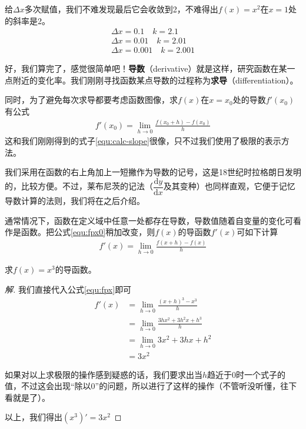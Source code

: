 给$\Delta x$多次赋值，我们不难发现最后它会收敛到2，不难得出$f(x)=x^2$在$x=1$处的斜率是2。
\begin{gather*}
    \Delta x=0.1 \quad k=2.1 \\
    \Delta x=0.01 \quad k=2.01 \\
    \Delta x=0.001 \quad k=2.001
\end{gather*}

好，我们算完了，感觉很简单吧！\textbf{导数}（derivative）就是这样，研究函数在某一点附近的变化率。我们刚刚寻找函数某点导数的过程称为\textbf{求导}（differentiation）。

同时，为了避免每次求导都要考虑函数图像，求$f(x)$在$x=x_0$处的导数$f'(x_0)$有公式
\begin{gather}
    f'(x_0)=\lim_{h\to0}\frac{f(x_0+h)-f(x_0)}{h} \label{equ:fpx0}
\end{gather}
这和我们刚刚得到的式子\eqref{equ:calc-slope}很像，只不过我们使用了极限的表示方法。

我们采用在函数的右上角加上一短撇作为导数的记号，这是18世纪时拉格朗日发明的，比较方便。不过，莱布尼茨的记法（$\dfrac{\mathrm{d}y}{\mathrm{d}x}$及其变种）也同样直观，它便于记忆导数计算的法则，我们将在之后介绍。

通常情况下，函数在定义域中任意一处都存在导数，导数值随着自变量的变化可看作是函数。把公式\eqref{equ:fpx0}稍加改变，则$f(x)$的导函数$f'(x)$可如下计算
\begin{gather}
    f'(x)=\lim_{h\to0}\frac{f(x+h)-f(x)}{h} \label{equ:fpx}
\end{gather}

\begin{example}
    求$f(x)=x^3$的导函数。
\end{example}

\begin{proof}[解]
    我们直接代入公式\eqref{equ:fpx}即可
    \begin{align*}
        f'(x)&=\lim_{h\to0}\frac{(x+h)^3-x^3}{h} \\
             &=\lim_{h\to0}\frac{3hx^2+3h^2x+h^3}{h} \\
             &=\lim_{h\to0}3x^2+3hx+h^2 \\
             &=3x^2
    \end{align*}

    如果对以上求极限的操作感到疑惑的话，我们要求出当$h$趋近于0时一个式子的值，不过这会出现“除以0”的问题，所以进行了这样的操作（不管听没听懂，往下看就是了）。

    以上，我们得出$(x^3)'=3x^2$\qedhere
\end{proof}

